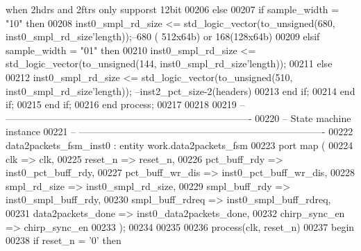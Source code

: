 \begin{DoxyCode}
{      when} 2hdrs \textcolor{keywordflow}{and} 2ftrs only supporst 12bit
00206         \textcolor{keywordflow}{else}
00207             \textcolor{keywordflow}{if} \textcolor{vhdlchar}{sample_width} \textcolor{vhdlchar}{=} \textcolor{vhdllogic}{"10"} \textcolor{keywordflow}{then}
00208                 inst0\_smpl\_rd\_size <= \textcolor{comment}{std\_logic\_vector}(to\_unsigned(\textcolor{vhdllogic}{680}, inst0\_smpl\_rd\_size'length));--680 (\textcolor{vhdllogic}{
      512x64b}) \textcolor{keywordflow}{or} \textcolor{vhdllogic}{168}(\textcolor{vhdllogic}{128x64b})
00209             \textcolor{keywordflow}{elsif} \textcolor{vhdlchar}{sample_width} \textcolor{vhdlchar}{=} \textcolor{vhdllogic}{"01"} \textcolor{keywordflow}{then}
00210                 inst0\_smpl\_rd\_size <= \textcolor{comment}{std\_logic\_vector}(to\_unsigned(\textcolor{vhdllogic}{144}, inst0\_smpl\_rd\_size'length));
00211             \textcolor{keywordflow}{else}
00212                 inst0\_smpl\_rd\_size <= \textcolor{comment}{std\_logic\_vector}(to\_unsigned(\textcolor{vhdllogic}{510}, inst0\_smpl\_rd\_size'length));
      --inst2\_pct\_size-2(headers)
00213             \textcolor{keywordflow}{end} \textcolor{keywordflow}{if};
00214         \textcolor{keywordflow}{end} \textcolor{keywordflow}{if};
00215    \textcolor{keywordflow}{end} \textcolor{keywordflow}{if};
00216 \textcolor{keywordflow}{end} \textcolor{keywordflow}{process};
00217 
00218 
00219 \textcolor{keyword}{-- ----------------------------------------------------------------------------}
00220 \textcolor{keyword}{-- State machine instance}
00221 \textcolor{keyword}{-- ----------------------------------------------------------------------------}
00222 data2packets\_fsm\_inst0 : \textcolor{keywordflow}{entity} work.data2packets_fsm
00223    \textcolor{keywordflow}{port} \textcolor{keywordflow}{map} (
00224       clk               => clk,
00225       reset_n           => reset_n,
00226       pct_buff_rdy      => inst0_pct_buff_rdy,
00227       pct_buff_wr_dis   => inst0_pct_buff_wr_dis,
00228       smpl_rd_size      => inst0_smpl_rd_size,
00229       smpl_buff_rdy     => inst0_smpl_buff_rdy,
00230       smpl_buff_rdreq   => inst0_smpl_buff_rdreq,
00231       data2packets_done => inst0_data2packets_done,
00232         chirp_sync_en       => chirp_sync_en
00233         \textcolor{vhdlchar}{)};
00234         
00235  
00236 \textcolor{keywordflow}{process}(clk, reset_n)
00237 \textcolor{vhdlkeyword}{begin}
00238    \textcolor{keywordflow}{if} \textcolor{vhdlchar}{reset_n} \textcolor{vhdlchar}{=} \textcolor{vhdlchar}{'}\textcolor{vhdllogic}{}\textcolor{vhdllogic}{0}\textcolor{vhdlchar}{'} \textcolor{keywordflow}{then} 

\end{DoxyCode}
